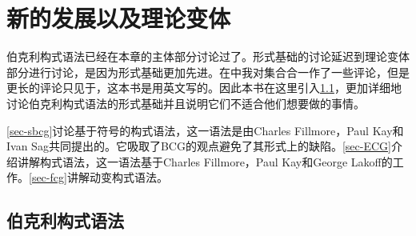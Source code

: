 \section{新的发展以及理论变体}

伯克利构式语法已经在本章的主体部分讨论过了。形式基础的讨论延迟到理论变体部分进行讨论，是因为形式基础更加先进。在中我对集合合一作了一些评论，但是更长的评论只见于，这本书是用英文写的。因此本书在这里引入\ref{sec-formal-bcg}，更加详细地讨论伯克利构式语法的形式基础并且说明它们不适合他们想要做的事情。

\ref{sec-sbcg}讨论基于符号的构式语法，这一语法是由Charles Fillmore，Paul Kay和Ivan Sag共同提出的。它吸取了BCG的观点避免了其形式上的缺陷。\ref{sec-ECG}介绍讲解构式语法，这一语法基于Charles Fillmore，Paul Kay和George Lakoff的工作。\ref{sec-fcg}讲解动变构式语法。

\subsection{伯克利构式语法}
\label{sec-formal-bcg}

